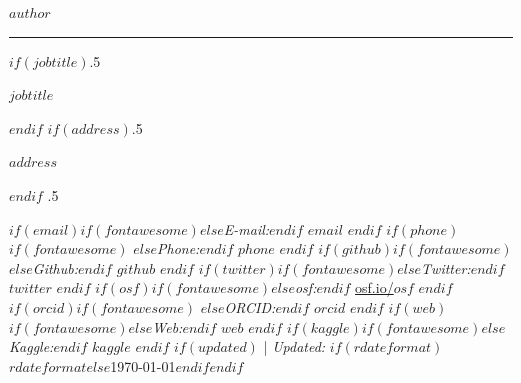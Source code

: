 
\usepackage{datetime}


\usepackage{orcidlink}




\centerline{\huge \bf $author$}

\vspace{2 mm}

\hrule

\vspace{2 mm}

$if(jobtitle)$\moveleft.5\hoffset\centerline{$jobtitle$}$endif$
$if(address)$\moveleft.5\hoffset\centerline{$address$}$endif$
\moveleft.5\hoffset\centerline{ $if(email)$$if(fontawesome)$\faEnvelope \hspace{1 mm}$else$\emph{E-mail:}$endif$ \href{mailto:}{$email$} \hspace{1 mm}$endif$ $if(phone)$$if(fontawesome)$ \faPhone \hspace{1 mm}$else$\emph{Phone:}$endif$  $phone$  \hspace{1 mm} $endif$ $if(github)$$if(fontawesome)$\faGithub \hspace{1 mm}$else$\emph{Github:}$endif$ \href{http://github.com/$github$}{$github$} \hspace{1 mm} $endif$  $if(twitter)$$if(fontawesome)$\faTwitter \hspace{1 mm}$else$\emph{Twitter:}$endif$ \href{https:/twitter.com/$twitter$}{$twitter$} \hspace{1 mm} $endif$ $if(osf)$$if(fontawesome)$\faUnlock \hspace{1 mm}$else$\emph{osf:}$endif$ \href{https:/osf.io/$osf$}{osf.io/$osf$} \hspace{1 mm} $endif$ $if(orcid)$$if(fontawesome)$ \hspace{.5 mm}$else$\emph{ORCID:}$endif$ \href{https://orcid.org/$orcid$}{$orcid$} \hspace{1 mm} $endif$ $if(web)$$if(fontawesome)$\faGlobe \hspace{1 mm}$else$\emph{Web:}$endif$ \href{http://$web$}{$web$}  $endif$ $if(kaggle)$$if(fontawesome)$\faKaggle \hspace{1 mm}$else$\emph{Kaggle:}$endif$ \href{http://kaggle.com/$kaggle$}{$kaggle$} \hspace{1 mm} $endif$   $if(updated)$ | \emph{Updated:} $if(rdateformat)$$rdateformat$$else$\apstylekinda\today$endif$$endif$}



